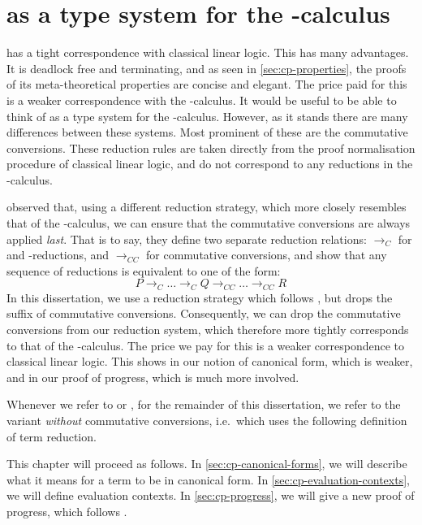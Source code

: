 \chapter{\cp as a type system for the \textpi-calculus}\label{sec:cppi}
\cp has a tight correspondence with classical linear logic.
This has many advantages.
It is deadlock free and terminating, and as seen in \cref{sec:cp-properties},
the proofs of its meta-theoretical properties are concise and elegant.
The price paid for this is a weaker correspondence with the \textpi-calculus.
It would be useful to be able to think of \cp as a type system for the
\textpi-calculus.
However, as it stands there are many differences between these systems.
Most prominent of these are the commutative conversions. These reduction rules
are taken directly from the proof normalisation procedure of classical linear
logic, and do not correspond to any reductions in the \textpi-calculus.


 observed that, using a different reduction
strategy, which more closely resembles that of the \textpi-calculus, we can
ensure that the commutative conversions are always applied \emph{last}.
That is to say, they define two separate reduction relations:
$\longrightarrow_{C}$ for  and \textbeta-reductions,
and $\longrightarrow_{CC}$ for commutative conversions, and show that any
sequence of reductions is equivalent to one of the form:
\[
  P \longrightarrow_{C} \dots \longrightarrow_{C} Q \longrightarrow_{CC} \dots \longrightarrow_{CC} R
\]
In this dissertation, we use a reduction strategy which follows
, but drops the suffix of commutative
conversions.
Consequently, we can drop the commutative conversions from our reduction system,
which therefore more tightly corresponds to that of the \textpi-calculus.
The price we pay for this is a weaker correspondence to classical linear logic.
This shows in our notion of canonical form, which is weaker, and in our proof of
progress, which is much more involved.

Whenever we refer to \cp or \rcp, for the remainder of this dissertation, we
refer to the variant \emph{without} commutative conversions, i.e.\ which uses
the following definition of term reduction.


This chapter will proceed as follows.
In \cref{sec:cp-canonical-forms}, we will describe what it means for a term to
be in canonical form.
In \cref{sec:cp-evaluation-contexts}, we will define evaluation contexts.
In \cref{sec:cp-progress}, we will give a new proof of progress, which follows
.

